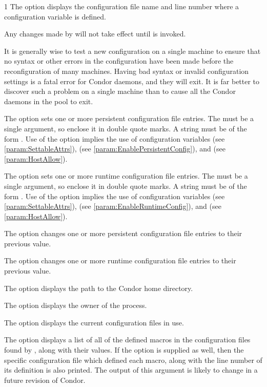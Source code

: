 \begin{ManPage}{\label{man-condor-config-val}}{1}
The  option displays the configuration
file name and line number where a configuration variable is defined.

Any changes made by  will not take effect
until  is invoked.

It is generally wise to test a new configuration on a single
machine to ensure that no syntax or other errors in the
configuration have been made before the reconfiguration of many machines.  
Having bad syntax or invalid configuration settings is a fatal error
for Condor daemons, and they will exit.
It is far better to discover such a problem on a single machine than to
cause all the Condor daemons in the pool to exit.

The  option sets one or more persistent configuration file entries.
The  must be a single argument, so enclose it in double quote marks.
A string must be of the form .
Use of the  option implies the use of configuration variables
 (see \ref{param:SettableAttrs}),
 (see \ref{param:EnablePersistentConfig}),
and  (see \ref{param:HostAllow}).

The  option sets one or more runtime configuration file entries.
The  must be a single argument, so enclose it in double quote marks.
A string must be of the form .
Use of the  option implies the use of configuration variables
 (see \ref{param:SettableAttrs}),
 (see \ref{param:EnableRuntimeConfig}),
and  (see \ref{param:HostAllow}).

The  option changes one or more persistent configuration file
entries to their previous value.

The  option changes one or more runtime configuration file
entries to their previous value.

The  option displays the path to the Condor home directory.

The  option displays the owner of the  process.

The  option displays the current configuration files in use.

The  option displays a list of all of the defined macros
in the configuration files found by , along with
their values. If the  option is supplied as well,
then the specific configuration file which defined each macro,
along with the line number of its definition is also printed. 
\Note The output of this argument is likely to change 
in a future revision of Condor.


\end{ManPage}
